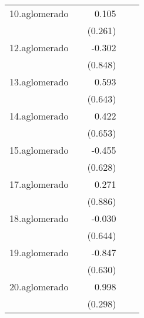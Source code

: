{\begin{longtable}{l*{4}{D{.}{.}{-1}}}
\addlinespace
10.aglomerado&                     &       0.105         &                     &                     \\
            &                     &     (0.261)         &                     &                     \\
\addlinespace
12.aglomerado&                     &      -0.302         &                     &                     \\
            &                     &     (0.848)         &                     &                     \\
\addlinespace
13.aglomerado&                     &       0.593         &                     &                     \\
            &                     &     (0.643)         &                     &                     \\
\addlinespace
14.aglomerado&                     &       0.422         &                     &                     \\
            &                     &     (0.653)         &                     &                     \\
\addlinespace
15.aglomerado&                     &      -0.455         &                     &                     \\
            &                     &     (0.628)         &                     &                     \\
\addlinespace
17.aglomerado&                     &       0.271         &                     &                     \\
            &                     &     (0.886)         &                     &                     \\
\addlinespace
18.aglomerado&                     &      -0.030         &                     &                     \\
            &                     &     (0.644)         &                     &                     \\
\addlinespace
19.aglomerado&                     &      -0.847         &                     &                     \\
            &                     &     (0.630)         &                     &                     \\
\addlinespace
20.aglomerado&                     &       0.998\sym{***}&                     &                     \\
            &                     &     (0.298)         &                     &                     \\

\end{longtable}}
